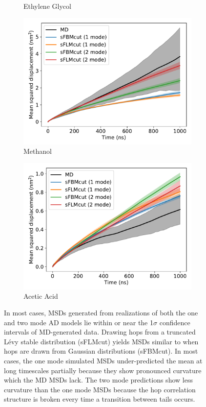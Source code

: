 \documentclass[aps,pre,preprint,groupedaddress,longbibliography]{revtex4-2}
\begin{document}
\begin{figure}
\begin{subfigure}{0.45\textwidth}
  \caption{Ethylene Glycol}\label{fig:bothmode_msd_comparison_GCL}
  \end{subfigure}
  \begin{subfigure}{0.45\textwidth}
  \includegraphics[width=\textwidth]{bothmode_msd_comparison_MET.pdf}
  \caption{Methanol}\label{fig:bothmode_msd_comparison_MET}
  \end{subfigure}
  \begin{subfigure}{0.45\textwidth}
  \includegraphics[width=\textwidth]{bothmode_msd_comparison_ACH.pdf}
  \caption{Acetic Acid}\label{fig:bothmode_msd_comparison_ACH}
  \end{subfigure}
  \caption{In most cases, MSDs generated from realizations of both the one and
	  two mode AD models lie within or near the 1$\sigma$ confidence
	  intervals of MD-generated data. Drawing hops from a truncated L\'evy
	  stable distribution (sFLMcut) yields MSDs similar to when hops are
	  drawn from Gaussian distributions (sFBMcut). In most cases, the one
	  mode simulated MSDs under-predicted the mean at long timescales
	  partially because they show pronounced curvature which the MD MSDs
	  lack. The two mode predictions show less curvature than the one mode
	  MSDs because the hop correlation structure is broken every time a
	  transition between tails occurs.
  }\label{fig:anomalous_msds}
  \end{figure}
  
\end{document}

